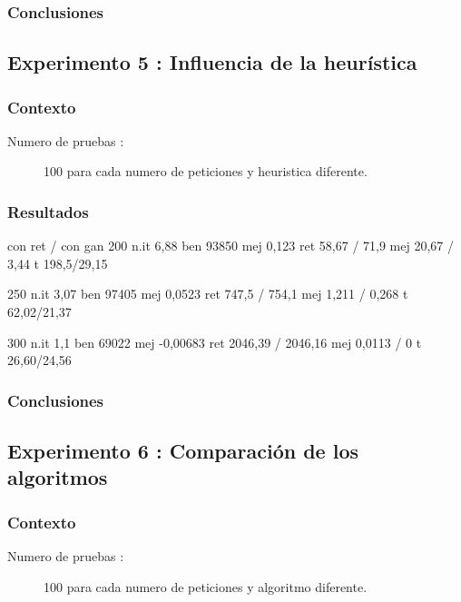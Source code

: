 \documentclass{article}
\begin{document}
\subsubsection{Conclusiones}

\subsection{Experimento 5 : Influencia de la heurística}

\subsubsection{Contexto}
\begin{description}
\item[Numero de pruebas :] 100 para cada numero de peticiones y heuristica
diferente.
\end{description}

\subsubsection{Resultados}
con ret / con gan
200
n.it 6,88
ben 93850
mej 0,123
ret 58,67 / 71,9
mej 20,67 / 3,44
t 198,5/29,15

250
n.it 3,07
ben 97405
mej 0,0523
ret 747,5 / 754,1
mej 1,211 / 0,268
t 62,02/21,37

300
n.it 1,1
ben 69022
mej -0,00683
ret 2046,39 / 2046,16
mej 0,0113 / 0
t 26,60/24,56

\subsubsection{Conclusiones}

\subsection{Experimento 6 : Comparación de los algoritmos}

\subsubsection{Contexto}
\begin{description}
\item[Numero de pruebas :] 100 para cada numero de peticiones y algoritmo
diferente.
\end{description}
\end{document}
